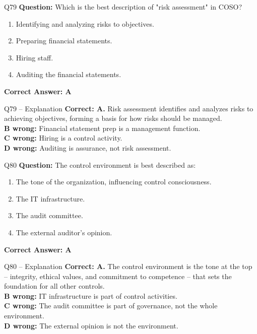 \documentclass[aspectratio=169,10pt]{beamer}
\begin{document}
	\begin{frame}[t]{Q79}
		\small
		\textbf{Question:} Which is the best description of "risk assessment" in COSO?
		\begin{enumerate}[label=\Alph*.,itemsep=1pt,topsep=2pt]
			\item Identifying and analyzing risks to objectives.
			\item Preparing financial statements.
			\item Hiring staff.
			\item Auditing the financial statements.
		\end{enumerate}
		\vspace{4pt}
		\textbf{Correct Answer: A}
	\end{frame}
	
	\begin{frame}[t]{Q79 -- Explanation}
		\small
		\textbf{Correct: A.} Risk assessment identifies and analyzes risks to achieving objectives, forming a basis for how risks should be managed. \\[4pt]
		\textbf{B wrong:} Financial statement prep is a management function. \\[2pt]
		\textbf{C wrong:} Hiring is a control activity. \\[2pt]
		\textbf{D wrong:} Auditing is assurance, not risk assessment.
	\end{frame}
	
	\begin{frame}[t]{Q80}
		\small
		\textbf{Question:} The control environment is best described as:
		\begin{enumerate}[label=\Alph*.,itemsep=1pt,topsep=2pt]
			\item The tone of the organization, influencing control consciousness.
			\item The IT infrastructure.
			\item The audit committee.
			\item The external auditor's opinion.
		\end{enumerate}
		\vspace{4pt}
		\textbf{Correct Answer: A}
	\end{frame}
	
	\begin{frame}[t]{Q80 -- Explanation}
		\small
		\textbf{Correct: A.} The control environment is the tone at the top -- integrity, ethical values, and commitment to competence -- that sets the foundation for all other controls. \\[4pt]
		\textbf{B wrong:} IT infrastructure is part of control activities. \\[2pt]
		\textbf{C wrong:} The audit committee is part of governance, not the whole environment. \\[2pt]
		\textbf{D wrong:} The external opinion is not the environment.
	\end{frame}
	
\end{document}

